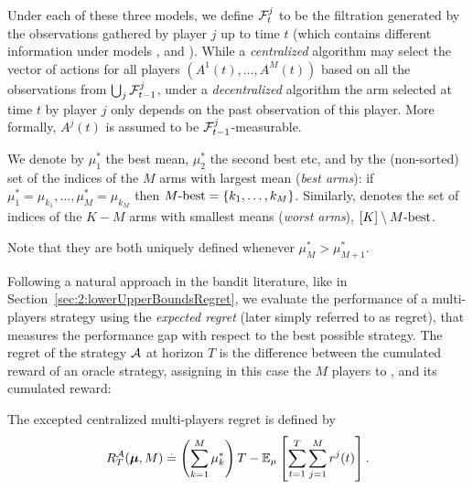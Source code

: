 Under each of these three models, we define $\mathcal{F}^j_t$ to be the filtration generated by the observations gathered by player $j$ up to time $t$ (which contains different information under models \modelun, \modeldeux{} and \modeltrois).
While a \emph{centralized} algorithm may select the vector of actions for all players $(A^1(t),\dots,A^M(t))$ based on all the observations from $\bigcup_j \mathcal{F}^j_{t-1}$, under a \emph{decentralized} algorithm the arm selected at time $t$ by player $j$ only depends on the past observation of this player.
More formally, $A^j(t)$ is assumed to be $\mathcal{F}^j_{t-1}$-measurable.

\begin{definition}\label{def:5:MbestMworst}
\begin{leftbar}[defnbar]  %
  We denote by $\mu_1^*$ the best mean, $\mu_2^*$ the second best etc, and
  by \Mbest{} the (non-sorted) set of the indices of the $M$ arms with largest mean (\emph{best arms}): if $\mu_1^* = \mu_{k_1}, \dots, \mu_M^* = \mu_{k_M}$
  then $M\text{-}\mathrm{best} = \{k_1, \dots, k_M\}$.
  Similarly, \Mworst{} denotes the set of indices of the $K-M$ arms with smallest means (\emph{worst arms}),
  $[K] \setminus M\text{-}\mathrm{best}$.

  Note that they are both uniquely defined whenever $\mu_M^* > \mu_{M+1}^*$.
\end{leftbar}  %
\end{definition}

Following a natural approach in the bandit literature, like in Section~\ref{sec:2:lowerUpperBoundsRegret},
we evaluate the performance of a multi-players strategy using the \emph{expected regret} (later simply referred to as regret), that measures the performance gap with respect to the best possible strategy.
The regret of the strategy $\mathcal{A}$ at horizon $T$ is the difference between the cumulated reward of an oracle strategy, assigning in this case the $M$ players to \Mbest,
and its cumulated reward:

\begin{definition}
\begin{leftbar}[defnbar]  %
  The excepted centralized multi-players regret is defined by
  \begin{equation}\label{eq:5:regret}
    R_T^{\mathcal{A}}(\boldsymbol{\mu}, M) \overset{.}{=} \left(\sum_{k=1}^{M}\mu_k^*\right)T - \mathbb{E}_{\mu}\left[\sum_{t=1}^T\sum_{j=1}^M r^j(t)\right].
  \end{equation}
\end{leftbar}  %
\end{definition}

